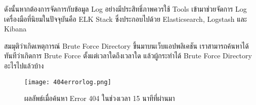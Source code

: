 ดังนั้นหากต้องการจัดการกับข้อมูล Log อย่างมีประสิทธิ์ภาพควรใช้ Tools เข้ามาช่วยจัดการ Log เครื่องมือที่นิยมในปัจจุบันคือ ELK Stack ซึ่งประกอบไปด้วย Elasticsearch\cite{}, Logstash\cite{} และ Kibana\cite{}

สมมุติว่าเกิดเหตุการณ์ Brute Force Directory ขึ้นมาบนเว็บแอปพลิเคชัน เราสามารถค้นหาได้ทันทีว่าเกิดการ Brute Force ตั้งแต่เวลาใดถึงเวลาใด แล้วผู้กระทำได้ Brute Force Directory อะไรไปแล้วบ้าง

\begin{figure}[h!]
	\centering
	\texttt{[image: 404errorlog.png]}
	\caption{ผลลัพธ์เมื่อค้นหา Error 404 ในช่วงเวลา 15 นาทีที่ผ่านมา}
	\label{Fig:404errorlog.png}
\end{figure}
